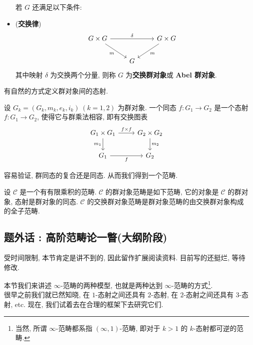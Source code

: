 \begin{definition}
\begin{itemize}
    若 $G$ 还满足以下条件:
    \item (\textbf{交换律})
    \[\begin{tikzcd}
	{G\times G} && {G\times G} \\
	& G
	\arrow["\delta", from=1-1, to=1-3]
	\arrow["m"', from=1-1, to=2-2]
	\arrow["m", from=1-3, to=2-2]
    \end{tikzcd}\]
    其中映射 $\delta$ 为交换两个分量,
    则称 $G$ 为\textbf{交换群对象}或 \textbf{Abel 群对象}.
\end{itemize}

\end{definition}

有自然的方式定义群对象间的态射.

\begin{definition}
    设 $G_k = (G_k, m_k, e_k, i_k) \ (k=1,2)$ 为群对象.
    一个同态 $f: G_1 \to G_2$ 是一个态射 $f: G_1 \to G_2$, 
    使得它与群乘法相容, 即有交换图表
    \[\begin{tikzcd}
	{G_1\times G_1} & {G_2\times G_2} \\
	{G_1} & {G_2}
	\arrow["{f\times f}", from=1-1, to=1-2]
	\arrow["{m_1}"', from=1-1, to=2-1]
	\arrow["{m_2}", from=1-2, to=2-2]
	\arrow["f"', from=2-1, to=2-2]
    \end{tikzcd}\]
\end{definition}

容易验证, 群同态的复合还是同态. 从而我们得到一个范畴.

\begin{definition}
    设 $\mathcal{C}$ 是一个有有限乘积的范畴.
    $\mathcal{C}$ 的群对象范畴是如下范畴,
    它的对象是 $\mathcal{C}$ 的群对象,
    态射是群对象的同态.
    $\mathcal{C}$ 的交换群对象范畴是群对象范畴的由交换群对象构成的全子范畴.
\end{definition}

\subsection{题外话 : 高阶范畴论一瞥(大纲阶段)}
\begin{remark}
    受时间限制, 本节肯定是讲不到的, 因此留作扩展阅读资料. 目前写的还挺烂, 等待修改.
\end{remark}
本节我们来讲述 $\infty$-范畴的两种模型, 也就是两种达到 $\infty$-范畴的方式\footnote{当然, 所谓 $\infty$-范畴都系指 $(\infty,1)$-范畴, 即对于 $k >1$ 的 $k$-态射都可逆的范畴.}.\\

很早之前我们就已然知晓, 在 $1$-态射之间还具有 $2$-态射, 在 $2$-态射之间还具有 $3$-态射, etc. 现在, 我们试着去在合理的框架下去研究它们.\\

